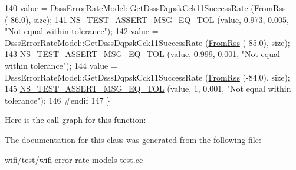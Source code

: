 \begin{DoxyCode}
140   value = DsssErrorRateModel::GetDsssDqpskCck11SuccessRate (\hyperlink{wifi-error-rate-models-test_8cc_a04e29db50fb1c1d787cf553ee9453e90}{FromRss} (-86.0), size);
141   \hyperlink{group__testing_ga9e7861b56b4e70db3b56044cb7a28e41}{NS\_TEST\_ASSERT\_MSG\_EQ\_TOL} (value, 0.973, 0.005, \textcolor{stringliteral}{"Not equal within tolerance"});
142   value = DsssErrorRateModel::GetDsssDqpskCck11SuccessRate (\hyperlink{wifi-error-rate-models-test_8cc_a04e29db50fb1c1d787cf553ee9453e90}{FromRss} (-85.0), size);
143   \hyperlink{group__testing_ga9e7861b56b4e70db3b56044cb7a28e41}{NS\_TEST\_ASSERT\_MSG\_EQ\_TOL} (value, 0.999, 0.001, \textcolor{stringliteral}{"Not equal within tolerance"});
144   value = DsssErrorRateModel::GetDsssDqpskCck11SuccessRate (\hyperlink{wifi-error-rate-models-test_8cc_a04e29db50fb1c1d787cf553ee9453e90}{FromRss} (-84.0), size);
145   \hyperlink{group__testing_ga9e7861b56b4e70db3b56044cb7a28e41}{NS\_TEST\_ASSERT\_MSG\_EQ\_TOL} (value, 1, 0.001, \textcolor{stringliteral}{"Not equal within tolerance"});
146 \textcolor{preprocessor}{#endif}
147 \}
\end{DoxyCode}


Here is the call graph for this function\+:




The documentation for this class was generated from the following file\+:\begin{DoxyCompactItemize}
\item 
wifi/test/\hyperlink{wifi-error-rate-models-test_8cc}{wifi-\/error-\/rate-\/models-\/test.\+cc}\end{DoxyCompactItemize}
